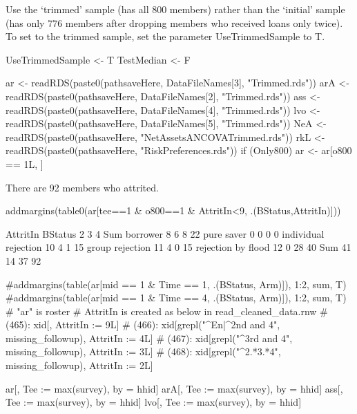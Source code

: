 Use the `trimmed' sample (has all 800 members) rather than the `initial' sample (has only 776 members after dropping members who received loans only twice). To set to the trimmed sample, set the parameter \textsf{UseTrimmedSample} to T.
\begin{Schunk}
\begin{Sinput}
UseTrimmedSample <- T
TestMedian <- F
\end{Sinput}
\end{Schunk}
\begin{Schunk}
\begin{Sinput}
ar <- readRDS(paste0(pathsaveHere, DataFileNames[3], "Trimmed.rds"))
arA <- readRDS(paste0(pathsaveHere, DataFileNames[2], "Trimmed.rds"))
ass <- readRDS(paste0(pathsaveHere, DataFileNames[4], "Trimmed.rds"))
lvo <- readRDS(paste0(pathsaveHere, DataFileNames[5], "Trimmed.rds"))
NeA <- readRDS(paste0(pathsaveHere, "NetAssetsANCOVATrimmed.rds"))
rkL <- readRDS(paste0(pathsaveHere, "RiskPreferences.rds"))
if (Only800) ar <- ar[o800 == 1L, ]
\end{Sinput}
\end{Schunk}
There are 92 members who attrited.
\begin{Schunk}
\begin{Sinput}
addmargins(table0(ar[tee==1 & o800==1 & AttritIn<9, .(BStatus,AttritIn)]))
\end{Sinput}
\begin{Soutput}
                      AttritIn
BStatus                 2  3  4 Sum
  borrower              8  6  8  22
  pure saver            0  0  0   0
  individual rejection 10  4  1  15
  group rejection      11  4  0  15
  rejection by flood   12  0 28  40
  Sum                  41 14 37  92
\end{Soutput}
\begin{Sinput}
#addmargins(table(ar[mid == 1 & Time == 1, .(BStatus, Arm)]), 1:2, sum, T)
#addmargins(table(ar[mid == 1 & Time == 4, .(BStatus, Arm)]), 1:2, sum, T)
# "ar" is roster
# AttritIn is created as below in read_cleaned_data.rnw
# (465): xid[, AttritIn := 9L]
# (466): xid[grepl("^En|^2nd and 4", missing_followup), AttritIn := 4L]
# (467): xid[grepl("^3rd and 4", missing_followup), AttritIn := 3L]
# (468): xid[grepl("^2.*3.*4", missing_followup), AttritIn := 2L]
\end{Sinput}
\end{Schunk}
\begin{Schunk}
\begin{Sinput}
ar[, Tee := max(survey), by = hhid]
arA[, Tee := max(survey), by = hhid]
ass[, Tee := max(survey), by = hhid]
lvo[, Tee := max(survey), by = hhid]
\end{Sinput}
\end{Schunk}
